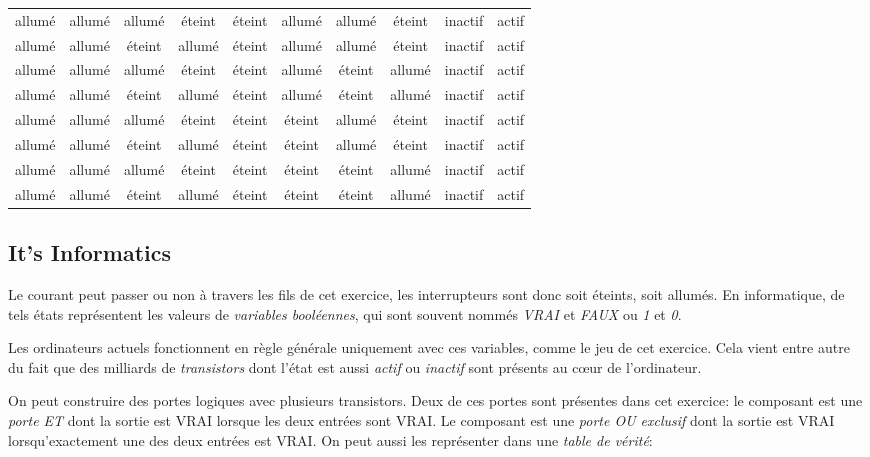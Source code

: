 \documentclass[a4paper,11pt]{report}
\newcommand{\taskGraphicsFolder}{..}
\begin{document}
{\begin{tabular}{ @{} c c c c c c c c c c @{} }
  allumé & allumé & allumé & éteint & éteint & allumé & allumé & éteint & inactif & actif \\ 
  allumé & allumé & éteint & allumé & éteint & allumé & allumé & éteint & inactif & actif \\ 
  allumé & allumé & allumé & éteint & éteint & allumé & éteint & allumé & inactif & actif \\ 
  allumé & allumé & éteint & allumé & éteint & allumé & éteint & allumé & inactif & actif \\ 
  allumé & allumé & allumé & éteint & éteint & éteint & allumé & éteint & inactif & actif \\ 
  allumé & allumé & éteint & allumé & éteint & éteint & allumé & éteint & inactif & actif \\ 
  allumé & allumé & allumé & éteint & éteint & éteint & éteint & allumé & inactif & actif \\ 
  allumé & allumé & éteint & allumé & éteint & éteint & éteint & allumé & inactif & actif
\end{tabular}


}


\subsection*{It’s Informatics}

Le courant peut passer ou non à travers les fils de cet exercice, les interrupteurs sont donc soit éteints, soit allumés. En informatique, de tels états représentent les valeurs de \emph{variables booléennes}, qui sont souvent nommés \emph{VRAI} et \emph{FAUX} ou \emph{1} et \emph{0}.

Les ordinateurs actuels fonctionnent en règle générale uniquement avec ces variables, comme le jeu de cet exercice. Cela vient entre autre du fait que des milliards de \emph{transistors} dont l’état est aussi \emph{actif} ou \emph{inactif} sont présents au cœur de l’ordinateur.

On peut construire des portes logiques avec plusieurs transistors. Deux de ces portes sont présentes dans cet exercice: le composant \raisebox{\dimexpr -0.5ex -0.6ex \relax}{} est une \emph{porte ET} dont la sortie est VRAI lorsque les deux entrées sont VRAI.   Le composant \raisebox{\dimexpr -0.5ex -0.6ex \relax}{} est une \emph{porte OU exclusif} dont la sortie est VRAI lorsqu’exactement une des deux entrées est VRAI. On peut aussi les représenter dans une \emph{table de vérité}:
\end{document}

